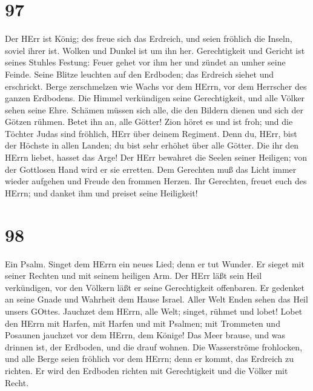 \hypertarget{section-96}{%
\section{97}\label{section-96}}

 Der HErr ist König; des freue sich das Erdreich, und seien
fröhlich die Inseln, soviel ihrer ist.  Wolken und Dunkel
ist um ihn her. Gerechtigkeit und Gericht ist seines Stuhles Festung:
 Feuer gehet vor ihm her und zündet an umher seine Feinde.
 Seine Blitze leuchten auf den Erdboden; das Erdreich siehet
und erschrickt.  Berge zerschmelzen wie Wachs vor dem HErrn,
vor dem Herrscher des ganzen Erdbodens.  Die Himmel
verkündigen seine Gerechtigkeit, und alle Völker sehen seine Ehre.
 Schämen müssen sich alle, die den Bildern dienen und sich
der Götzen rühmen. Betet ihn an, alle Götter!  Zion höret es
und ist froh; und die Töchter Judas sind fröhlich, HErr über deinem
Regiment.  Denn du, HErr, bist der Höchste in allen Landen;
du bist sehr erhöhet über alle Götter.  Die ihr den HErrn
liebet, hasset das Arge! Der HErr bewahret die Seelen seiner Heiligen;
von der Gottlosen Hand wird er sie erretten.  Dem Gerechten
muß das Licht immer wieder aufgehen und Freude den frommen Herzen.
 Ihr Gerechten, freuet euch des HErrn; und danket ihm und
preiset seine Heiligkeit!

\hypertarget{section-97}{%
\section{98}\label{section-97}}

 Ein Psalm. Singet dem HErrn ein neues Lied; denn er tut
Wunder. Er sieget mit seiner Rechten und mit seinem heiligen Arm.
 Der HErr läßt sein Heil verkündigen, vor den Völkern läßt
er seine Gerechtigkeit offenbaren.  Er gedenket an seine
Gnade und Wahrheit dem Hause Israel. Aller Welt Enden sehen das Heil
unsers GOttes.  Jauchzet dem HErrn, alle Welt; singet,
rühmet und lobet!  Lobet den HErrn mit Harfen, mit Harfen
und mit Psalmen;  mit Trommeten und Posaunen jauchzet vor
dem HErrn, dem Könige!  Das Meer brause, und was drinnen
ist, der Erdboden, und die drauf wohnen.  Die Wasserströme
frohlocken, und alle Berge seien fröhlich  vor dem HErrn;
denn er kommt, das Erdreich zu richten. Er wird den Erdboden richten mit
Gerechtigkeit und die Völker mit Recht.

